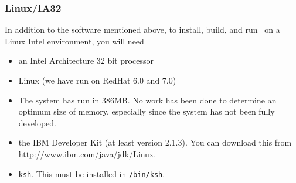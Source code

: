 \subsubsection{Linux/IA32}
In addition to the software mentioned above, to install, build, and
run \jp\ on a Linux Intel environment, you will need 
\begin{itemize}
\item an Intel Architecture 32 bit processor
\item Linux  (we have run on RedHat 6.0 and 7.0)
\item The system has run in 386MB. No work has been done to determine 
an optimum size of memory, especially since the system has not been fully developed.
\item the IBM Developer Kit (at least version 2.1.3).  You can download this from
           {http://www.ibm.com/java/jdk/Linux}.
\item {\tt ksh}. This must be installed in {\tt /bin/ksh}.
\end{itemize}

